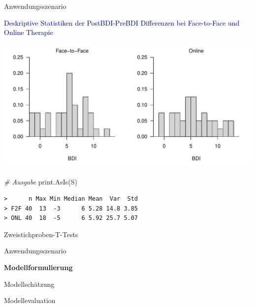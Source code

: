 \documentclass[
  8pt,
  ignorenonframetext,
]{beamer}
\newenvironment{Shaded}{\begin{snugshade}}{\end{snugshade}}
\newcommand{\CommentTok}[1]{\textcolor[rgb]{0.56,0.35,0.01}{\textit{#1}}}
\newcommand{\FunctionTok}[1]{\textcolor[rgb]{0.00,0.00,0.00}{#1}}
\newcommand{\NormalTok}[1]{#1}
\begin{document}
\begin{frame}[fragile]{Anwendungsszenario}
\protect\hypertarget{anwendungsszenario-11}{}
\small
\vspace{2mm}

\textcolor{darkblue}{Deskriptive Statistiken der PostBDI-PreBDI Differenzen bei Face-to-Face und Online Therapie}
\vspace{1mm}

\begin{center}\includegraphics[width=0.95\linewidth]{9_Abbildungen/alm_9_F2F_ONL_histogramme} \end{center}

\footnotesize

\begin{Shaded}
\begin{Highlighting}[]
\CommentTok{\# Ausgabe}
\FunctionTok{print.AsIs}\NormalTok{(S)}
\end{Highlighting}
\end{Shaded}

\begin{verbatim}
>      n Max Min Median Mean  Var  Std
> F2F 40  13  -3      6 5.28 14.8 3.85
> ONL 40  18  -5      6 5.92 25.7 5.07
\end{verbatim}
\end{frame}

\begin{frame}{Zweistichproben-T-Tests}
\protect\hypertarget{zweistichproben-t-tests-2}{}
\large
{}
\vfill

Anwendungsszenario

\textbf{Modellformulierung}

Modellschätzung

Modellevaluation \vfill
\end{frame}
\end{document}
